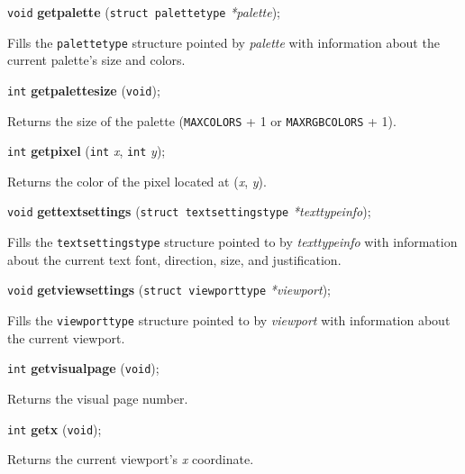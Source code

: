 \documentclass[a4paper,11pt]{article}
\newcommand{\V}{\texttt{void}}      %
\newcommand{\I}{\texttt{int}}       %
\newcommand{\func}[1]{\textbf{#1}}  %
\newcommand{\A}[1]{\emph{#1}}       %
\newcommand{\T}[1]{\texttt{#1}}     %
\newenvironment{bgi}
{ %
  \begin{snugshade}
}
{ %
  \end{snugshade}
}
\begin{document}

\begin{bgi}
\V{} \func{getpalette} (\texttt{struct palettetype} \A{*palette});
\end{bgi}

Fills the \texttt{palettetype} structure pointed by \A{palette} with
information about the current palette's size and colors.


\begin{bgi}
\I{} \func{getpalettesize} (\V{}); 
\end{bgi}

Returns the size of the palette (\T{MAXCOLORS} + 1 or
\T{MAXRGB\-COLORS} + 1).


\begin{bgi}
\I{} \func{getpixel} (\I{} \A{x}, \I{} \A{y});
\end{bgi}

Returns the color of the pixel located at (\A{x}, \A{y}).


\begin{bgi}
\V{} \func{gettextsettings} (\texttt{struct textsettingstype}
\A{*texttypeinfo});
\end{bgi}

Fills the \texttt{textsettingstype} structure pointed to by
\A{texttypeinfo} with information about the current text font,
direction, size, and justification.


\begin{bgi}
\V{} \func{getviewsettings} (\texttt{struct viewporttype} \A{*viewport});
\end{bgi}

Fills the \texttt{viewporttype} structure pointed to by \A{viewport}
with information about the current viewport.


\begin{bgi}
\I{} \func{getvisualpage} (\V{});
\end{bgi}

Returns the visual page number.


\begin{bgi}
\I{} \func{getx} (\V{});
\end{bgi}

Returns the current viewport's \A{x} coordinate.
\end{document}
